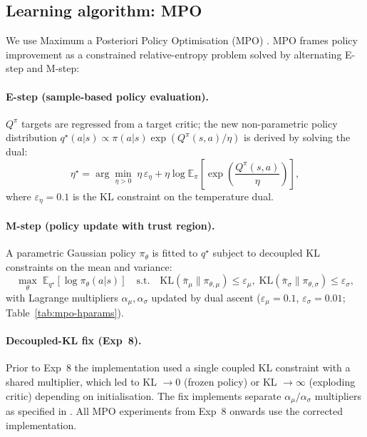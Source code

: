 \subsection{Learning algorithm: MPO}
\label{sec:mpo}

We use Maximum a Posteriori Policy Optimisation (MPO) \cite{abdolmaleki2018mpo}.
MPO frames policy improvement as a constrained relative-entropy problem solved by alternating E-step and M-step:

\paragraph{E-step (sample-based policy evaluation).}
$Q^\pi$ targets are regressed from a target critic; the new non-parametric policy distribution
$q^\star(a|s) \propto \pi(a|s)\exp(Q^\pi(s,a)/\eta)$
is derived by solving the dual:
\begin{equation}
  \eta^\star = \arg\min_{\eta>0}\;\eta\,\varepsilon_\eta + \eta\log\mathbb{E}_{\pi}\!\left[\exp\!\left(\frac{Q^\pi(s,a)}{\eta}\right)\right],
  \label{eq:mpo-dual}
\end{equation}
where $\varepsilon_\eta=0.1$ is the KL constraint on the temperature dual.

\paragraph{M-step (policy update with trust region).}
A parametric Gaussian policy $\pi_\theta$ is fitted to $q^\star$ subject to decoupled KL constraints on the mean and variance:
\begin{equation}
  \max_\theta\;\mathbb{E}_{q^\star}\!\left[\log\pi_\theta(a|s)\right]
  \quad\text{s.t.}\quad
  \mathrm{KL}(\bar\pi_\mu\|\pi_{\theta,\mu})\le\varepsilon_\mu,\;
  \mathrm{KL}(\bar\pi_\sigma\|\pi_{\theta,\sigma})\le\varepsilon_\sigma,
\end{equation}
with Lagrange multipliers $\alpha_\mu,\alpha_\sigma$ updated by dual ascent
($\varepsilon_\mu=0.1$, $\varepsilon_\sigma=0.01$; Table~\ref{tab:mpo-hparams}).

\paragraph{Decoupled-KL fix (Exp~8).}
Prior to Exp~8 the implementation used a single coupled KL constraint with a shared multiplier,
which led to KL $\to 0$ (frozen policy) or KL $\to \infty$ (exploding critic) depending on initialisation.
The fix implements separate $\alpha_\mu/\alpha_\sigma$ multipliers as specified in \citet{abdolmaleki2018mpo}.
All MPO experiments from Exp~8 onwards use the corrected implementation.

